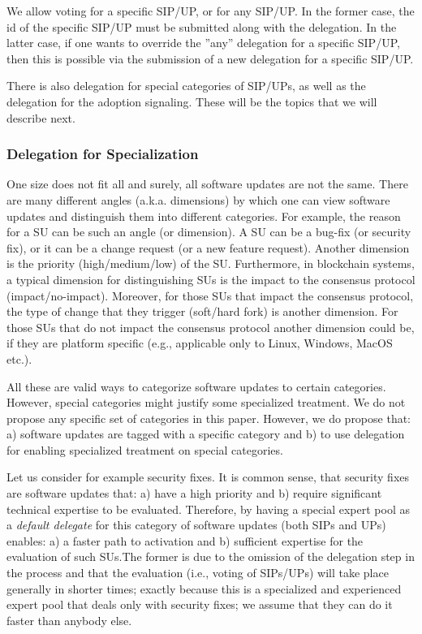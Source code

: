 We allow voting for a specific SIP/UP, or for any SIP/UP. In the former case, the id of the specific SIP/UP must be submitted along with the delegation. In the latter case, if one wants to override the ''any'' delegation for a specific SIP/UP, then this is possible via the submission of a new delegation for a specific SIP/UP. 

There is also delegation for special categories of SIP/UPs, as well as the delegation for the adoption signaling. These will be the topics that we will describe next.

\subsubsection{Delegation for Specialization}
One size does not fit all and surely, all software updates are not the same. There are many different angles (a.k.a. dimensions) by which one can view software updates and distinguish them into different categories. For example, the reason for a SU can be such an angle (or dimension). A SU can be a bug-fix (or security fix), or it can be a change request (or a new feature request). Another dimension is the priority (high/medium/low) of the SU. Furthermore, in blockchain systems, a typical dimension for distinguishing SUs is the impact to the consensus protocol (impact/no-impact). Moreover, for those SUs that impact the consensus protocol, the type of change that they trigger (soft/hard fork) is another dimension. For those SUs that do not impact the consensus protocol another dimension could be, if they are platform specific (e.g., applicable only to Linux, Windows, MacOS etc.). 

All these are valid ways to categorize software updates to certain categories. However, special categories might justify some specialized treatment. We do not propose any specific set of categories in this paper. However, we do propose that: a) software updates are tagged with a specific category and b) to use delegation for enabling specialized treatment on special categories.

Let us consider for example security fixes. It is common sense, that security fixes are software updates that: a) have a high priority and b) require significant technical expertise to be evaluated. Therefore, by having a special expert pool as a \emph{default delegate} for this category of software updates (both SIPs and UPs) enables: a) a faster path to activation and b) sufficient expertise for the evaluation of such SUs.The former is due to the omission of the delegation step in the process and that the evaluation (i.e., voting of SIPs/UPs) will take place generally in shorter times; exactly because this is a specialized and experienced expert pool that deals only with security fixes; we assume that they can do it faster than anybody else.

